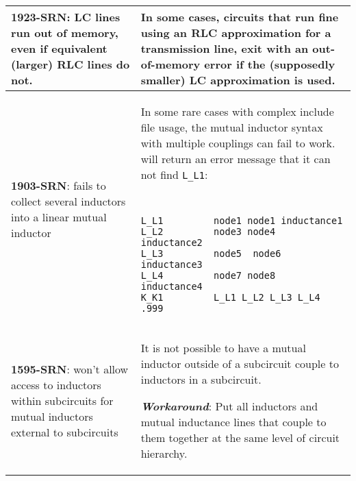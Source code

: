 {\begin{longtable}[h] {>{\raggedright\small}m{2in}|>{\raggedright\let\\\tabularnewline\small}m{3.5in}}
\textbf{1923-SRN}: LC lines run out of memory, even if equivalent (larger) RLC
lines do not. &  In some cases, circuits that run fine using an RLC approximation for a
transmission line, exit with an out-of-memory error if the (supposedly smaller) LC
approximation is used.
\\ \hline

\textbf{1903-SRN}: \Xyce{} fails to collect several inductors into a linear mutual inductor &
In some rare cases with complex include file usage, the mutual inductor syntax with multiple couplings can fail to work. \Xyce{} will return an error message that it can not find 
\texttt{L\_L1}:
{\tt
\begin{verbatim}
L_L1         node1 node1 inductance1
L_L2         node3 node4  inductance2
L_L3         node5  node6  inductance3
L_L4         node7 node8  inductance4
K_K1         L_L1 L_L2 L_L3 L_L4   .999 
\end{verbatim}
}

\\ \hline

\textbf{1595-SRN}: \Xyce{} won't allow access to inductors within subcircuits for
mutual inductors external to subcircuits & It is not possible to have a mutual
inductor outside of a subcircuit couple to inductors in a subcircuit.

\textbf{\textit{Workaround}}: Put all inductors and mutual inductance lines that couple to
them together at the same level of circuit hierarchy.
\\ \hline


\end{longtable}
}
